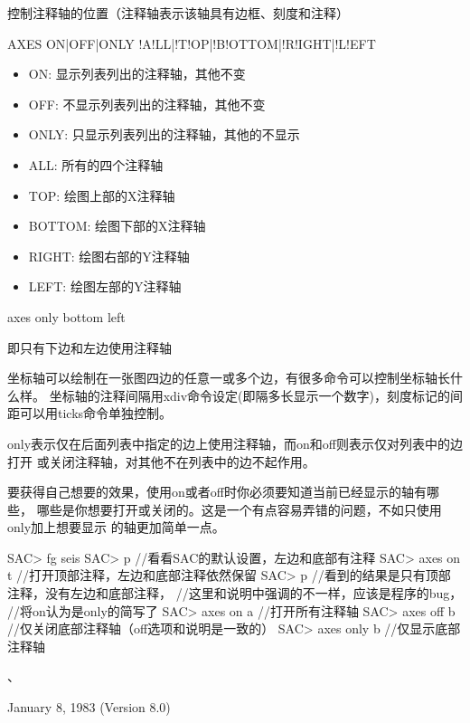 \label{cmd:axes}

控制注释轴的位置（注释轴表示该轴具有边框、刻度和注释）

\begin{SACSTX}
AXES ON|OFF|ONLY !A!LL|!T!OP|!B!OTTOM|!R!IGHT|!L!EFT
\end{SACSTX}

\begin{itemize}
\item ON: 显示列表列出的注释轴，其他不变
\item OFF: 不显示列表列出的注释轴，其他不变
\item ONLY: 只显示列表列出的注释轴，其他的不显示
\item ALL: 所有的四个注释轴
\item TOP: 绘图上部的X注释轴
\item BOTTOM: 绘图下部的X注释轴
\item RIGHT: 绘图右部的Y注释轴
\item LEFT: 绘图左部的Y注释轴
\end{itemize}

\begin{SACDFT}
axes only bottom left
\end{SACDFT}
即只有下边和左边使用注释轴

坐标轴可以绘制在一张图四边的任意一或多个边，有很多命令可以控制坐标轴长什么样。
坐标轴的注释间隔用xdiv命令设定(即隔多长显示一个数字)，刻度标记的间距可以用ticks命令单独控制。

only表示仅在后面列表中指定的边上使用注释轴，而on和off则表示仅对列表中的边打开
或关闭注释轴，对其他不在列表中的边不起作用。

要获得自己想要的效果，使用on或者off时你必须要知道当前已经显示的轴有哪些，
哪些是你想要打开或关闭的。这是一个有点容易弄错的问题，不如只使用only加上想要显示
的轴更加简单一点。

\begin{SACCode}
SAC> fg seis
SAC> p           //看看SAC的默认设置，左边和底部有注释
SAC> axes on t   //打开顶部注释，左边和底部注释依然保留
SAC> p           //看到的结果是只有顶部注释，没有左边和底部注释，
                 //这里和说明中强调的不一样，应该是程序的bug，
                 //将on认为是only的简写了
SAC> axes on a   //打开所有注释轴
SAC> axes off b  //仅关闭底部注释轴（off选项和说明是一致的）
SAC> axes only b //仅显示底部注释轴
\end{SACCode}

、

January 8, 1983 (Version 8.0)
